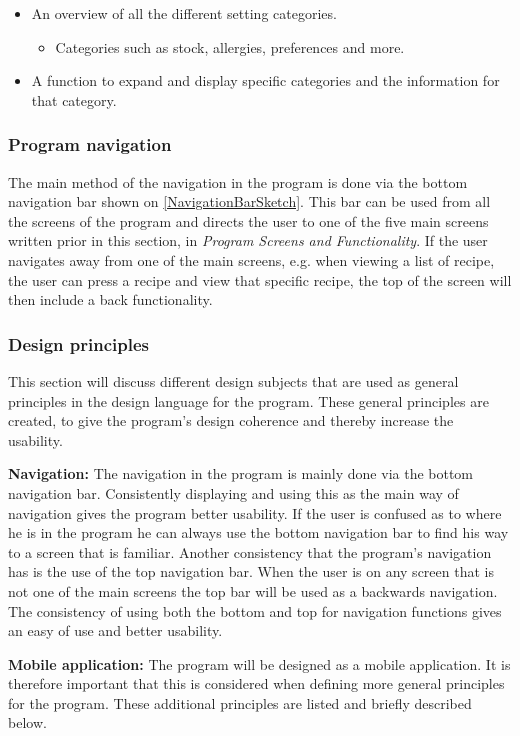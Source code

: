\begin{itemize}
	\item An overview of all the different setting categories.
		\begin{itemize}
			\item Categories such as stock, allergies, preferences and more.
		\end{itemize}
	\item A function to expand and display specific categories and the information for that category.
\end{itemize} 
 
\subsubsection{Program navigation}
The main method of the navigation in the program is done via the bottom navigation bar shown on \cref{NavigationBarSketch}. This bar can be used from all the screens of the program and directs the user to one of the five main screens written prior in this section, in \textit{Program Screens and Functionality}. If the user navigates away from one of the main screens, e.g. when viewing a list of recipe, the user can press a recipe and view that specific recipe, the top of the screen will then include a back functionality. 

\subsubsection{Design principles}
This section will discuss different design subjects that are used as general principles in the design language for the program. These general principles are created, to give the program's design coherence and thereby increase the usability.

\textbf{Navigation:}
The navigation in the program is mainly done via the bottom navigation bar. Consistently displaying and using this as the main way of navigation gives the program better usability. If the user is confused as to where he is in the program he can always use the bottom navigation bar to find his way to a screen that is familiar. Another consistency that the program's navigation has is the use of the top navigation bar. When the user is on any screen that is not one of the main screens the top bar will be used as a backwards navigation. The consistency of using both the bottom and top for navigation functions gives an easy of use and better usability.

\textbf{Mobile application:}
The program will be designed as a mobile application. It is therefore important that this is considered when defining more general principles for the program. These additional principles are listed and briefly described below.

